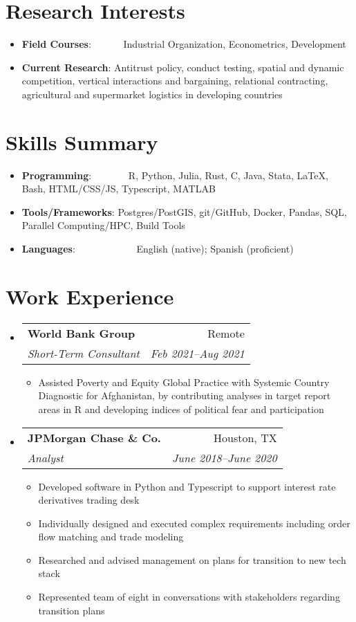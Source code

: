 \documentclass[a4paper,20pt]{article}
\makeatletter
\newcommand{\resumeItem}[2]{
  \item\small{
    \textbf{#1}{: #2 \vspace{-2pt}}
  }
}
\newcommand{\resumeSubheading}[4]{
  \vspace{-1pt}\item
    \begin{tabular*}{0.97\textwidth}{l@{\extracolsep{\fill}}r}
      \textbf{#1} & #2 \\
      \textit{#3} & \textit{#4} \\
    \end{tabular*}\vspace{-5pt}
}
\newcommand{\resumeSubItem}[2]{\resumeItem{#1}{#2}\vspace{-3pt}}
\newcommand{\resumeSubHeadingListStart}{\begin{itemize}[leftmargin=*]}
\newcommand{\resumeSubHeadingListEnd}{\end{itemize}}
\newcommand{\resumeItemListStart}{\begin{itemize}}
\newcommand{\resumeItemListEnd}{\end{itemize}\vspace{-5pt}}
\makeatother
\begin{document}
\section{Research Interests}
\begin{itemize}[leftmargin=*, itemindent=-9em]
  \resumeSubItem{Field Courses}{~~~~~~Industrial Organization, Econometrics, Development}
  \resumeSubItem{Current Research}{Antitrust policy, conduct testing, spatial and dynamic competition, vertical interactions and bargaining, relational contracting, agricultural and supermarket logistics in developing countries}
  \resumeSubHeadingListEnd
	    
\vspace{-5pt}
\section{Skills Summary}
	\resumeSubHeadingListStart
	\resumeSubItem{Programming}{~~~~~~~R, Python, Julia, Rust, C, Java, Stata, LaTeX, Bash, HTML/CSS/JS, Typescript, MATLAB}
	\resumeSubItem{Tools/Frameworks}{Postgres/PostGIS, git/GitHub, Docker, Pandas, SQL, Parallel Computing/HPC, Build Tools}
	\resumeSubItem{Languages}{~~~~~~~~~~~~English (native); Spanish (proficient)}

\resumeSubHeadingListEnd
\vspace{-5pt}
\section{Work Experience}
  \resumeSubHeadingListStart
    \resumeSubheading{World Bank Group}{Remote}
    {Short-Term Consultant}{Feb 2021–Aug 2021}
    \resumeItemListStart
        \item Assisted Poverty and Equity Global Practice with Systemic Country Diagnostic for Afghanistan, by contributing analyses in target report areas in R and developing indices of political fear and participation
      \resumeItemListEnd
    \resumeSubheading
		{JPMorgan Chase \& Co.}{Houston, TX}
		{Analyst}{June 2018–June 2020}
		\resumeItemListStart
        \item 
          {Developed software in Python and Typescript to support interest rate derivatives trading desk}
        \item  
          {Individually designed and executed complex requirements including order flow matching and trade modeling}
        \item {Researched and advised management on plans for transition to new tech stack}
        \item Represented team of eight in conversations with stakeholders regarding transition plans
		\resumeItemListEnd


\end{itemize}
\end{document}
